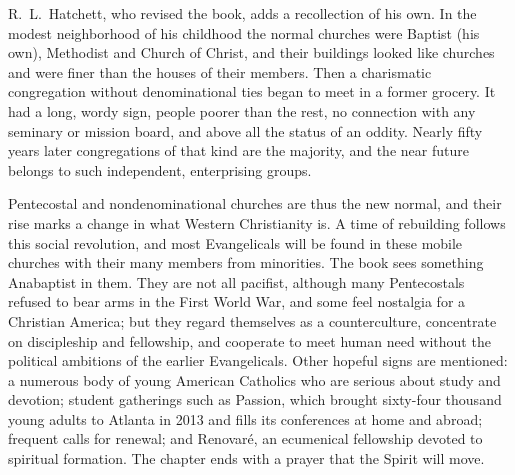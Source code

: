 R.~L.~Hatchett, who revised the book, adds a recollection of his own. In the modest neighborhood of
his childhood the normal churches were Baptist (his own), Methodist and Church of Christ, and their
buildings looked like churches and were finer than the houses of their members. Then a charismatic
congregation without denominational ties began to meet in a former grocery. It had a long, wordy
sign, people poorer than the rest, no connection with any seminary or mission board, and above all
the status of an oddity. Nearly fifty years later congregations of that kind are the majority, and
the near future belongs to such independent, enterprising groups.

Pentecostal and nondenominational churches are thus the new normal, and their rise marks a change in
what Western Christianity is. A time of rebuilding follows this social revolution, and most
Evangelicals will be found in these mobile churches with their many members from minorities. The
book sees something Anabaptist in them. They are not all pacifist, although many Pentecostals refused
to bear arms in the First World War, and some feel nostalgia for a Christian America; but they regard
themselves as a counterculture, concentrate on discipleship and fellowship, and cooperate to meet
human need without the political ambitions of the earlier Evangelicals. Other hopeful signs are
mentioned: a numerous body of young American Catholics who are serious about study and devotion;
student gatherings such as Passion, which brought sixty-four thousand young adults to Atlanta in 2013
and fills its conferences at home and abroad; frequent calls for renewal; and Renovar\'e, an
ecumenical fellowship devoted to spiritual formation. The chapter ends with a prayer that the Spirit
will move.

\begin{keyfacts}
\end{keyfacts}

